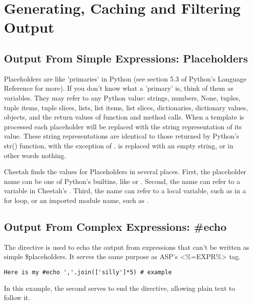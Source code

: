 \section{Generating, Caching and Filtering Output}
\label{output}

\subsection{Output From Simple Expressions: Placeholders}
\label{output.placeholders}

Placeholders are like 'primaries' in Python (see section 5.3 of Python's
Language Reference for more). If you don't know what a 'primary' is, think of
them as variables. They may refer to any Python value: strings, numbers, None,
tuples, tuple items, tuple slices, lists, list items, list slices, dictionaries,
dictionary values, objects, and the return values of function and method calls.
When a template is processed each placeholder will be replaced with the string
representation of its value.  These string representations are identical to
those returned by Python's str() function, with the exception of .
 is replaced with an empty string, or in other words nothing.

Cheetah finds the values for Placeholders in several places.  First, the
placeholder name can be one of Python's builtins, like  or
.  Second, the name can refer to a variable in Cheetah's
.  Third, the name can refer to a local variable, such as
 in a for loop, or an imported module name, such as .

\subsection{Output From Complex Expressions: \#echo}
\label{output.echo}

The  directive is used to echo the output from expressions that
can't be written as simple \$placeholders.  It serves the same purpose as ASP's
<\%=EXPR\%> tag.

\begin{verbatim}
Here is my #echo ','.join(['silly']*5) # example 
\end{verbatim}

In this example, the second \code{\#} serves to end the  directive,
allowing plain text to follow it.

